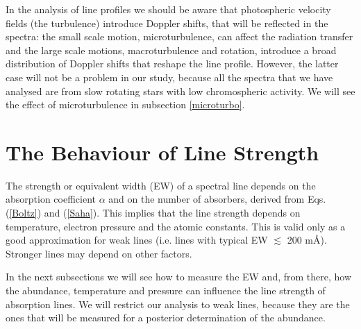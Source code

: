 \documentclass[dvips,12pt,a4paper]{report}
\begin{document}
{%




In the analysis of line profiles we should be aware that photospheric velocity fields (the turbulence) introduce Doppler shifts, that will be reflected in the spectra: the small scale motion, microturbulence, can affect the radiation transfer and the large scale motions, macroturbulence and rotation, introduce a broad distribution of Doppler shifts that reshape the line profile. However, the latter case will not be a problem in our study, because all the spectra that we have analysed are from slow rotating stars with low chromospheric activity. We will see the effect of microturbulence in subsection \ref{microturbo}.






\section{The Behaviour of Line Strength}
\label{linestr}
The strength or equivalent width (EW) of a spectral line depends on the absorption coefficient $\alpha$ and on the number of absorbers, derived from Eqs. (\ref{Boltz}) and (\ref{Saha}). This implies that the line strength depends on temperature, electron pressure and the atomic constants. This is valid only as a good approximation for weak lines (i.e. lines with typical EW $\lesssim$ 200 m\AA). Stronger lines may depend on other factors. 

In the next subsections we will see how to measure the EW and, from there, how the abundance, temperature and pressure can influence the line strength of absorption lines. We will restrict our analysis to weak lines, because they are the ones that will be measured for a posterior determination of the abundance.

}
\end{document}
